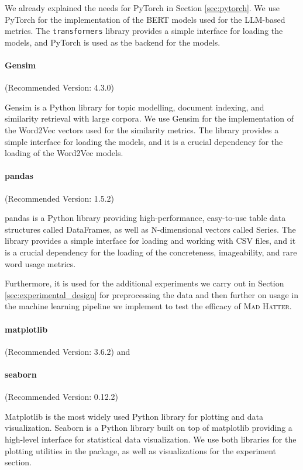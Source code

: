 We already explained the needs for PyTorch in Section \ref{sec:pytorch}. We use PyTorch for the implementation of the BERT models used for the LLM-based metrics. The \texttt{transformers} library provides a simple interface for loading the models, and PyTorch is used as the backend for the models.

\paragraph{Gensim} (Recommended Version: 4.3.0)

Gensim is a Python library for topic modelling, document indexing, and similarity retrieval with large corpora. We use Gensim for the implementation of the Word2Vec vectors used for the similarity metrics. The library provides a simple interface for loading the models, and it is a crucial dependency for the loading of the Word2Vec models.

\paragraph{pandas} (Recommended Version: 1.5.2)

pandas is a Python library providing high-performance, easy-to-use table data structures called DataFrames, as well as N-dimensional vectors called Series. The library provides a simple interface for loading and working with CSV files, and it is a crucial dependency for the loading of the concreteness, imageability, and rare word usage metrics.

Furthermore, it is used for the additional experiments we carry out in Section \ref{sec:experimental_design} for preprocessing the data and then further on usage in the machine learning pipeline we implement to test the efficacy of \textsc{Mad Hatter}.

\paragraph{matplotlib} (Recommended Version: 3.6.2) and \paragraph{seaborn} (Recommended Version: 0.12.2)

Matplotlib is the most widely used Python library for plotting and data visualization. Seaborn is a Python library built on top of matplotlib providing a high-level interface for statistical data visualization. We use both libraries for the plotting utilities in the package, as well as visualizations for the experiment section.


